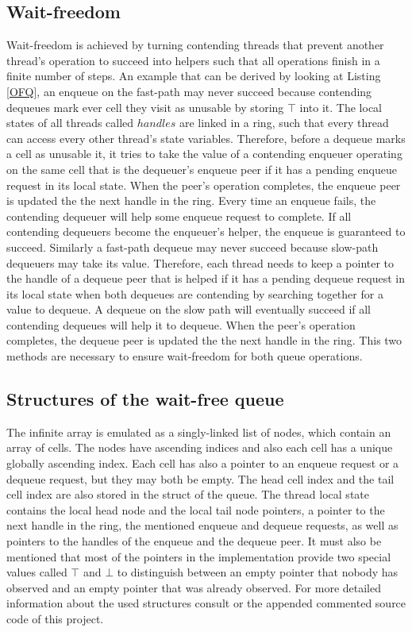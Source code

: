 \documentclass{article}
\begin{document}
\subsection{Wait-freedom}
Wait-freedom is achieved by turning contending threads that prevent another thread's operation to succeed into helpers such that all operations finish in a finite number of steps. An example that can be derived by looking at Listing \ref{OFQ}, an enqueue on the fast-path may never succeed because contending dequeues mark ever cell they visit as unusable by storing $\top$ into it. The local states of all threads called $handles$ are linked in a ring, such that every thread can access every other thread's state variables. Therefore, before a dequeue marks a cell as unusable it, it tries to take the value of a contending enqueuer operating on the same cell that is the dequeuer's enqueue peer if it has a pending enqueue request in its local state. When the peer's operation completes, the enqueue peer is updated the the next handle in the ring. Every time an enqueue fails, the contending dequeuer will help some enqueue request to complete. If all contending dequeuers become the enqueuer's helper, the enqueue is guaranteed to succeed. Similarly a fast-path dequeue may never succeed because slow-path dequeuers may take its value. Therefore, each thread needs to keep a pointer to the handle of a dequeue peer that is helped if it has a pending dequeue request in its local state when both dequeues are contending by searching together for a value to dequeue. A dequeue on the slow path will eventually succeed if all contending dequeues will help it to dequeue. When the peer's operation completes, the dequeue peer is updated the the next handle in the ring. This two methods are necessary to ensure wait-freedom for both queue operations.
\subsection{Structures of the wait-free queue}
The infinite array is emulated as a singly-linked list of nodes, which contain an array of cells. The nodes have ascending indices and also each cell has a unique globally ascending index. Each cell has also a pointer to an enqueue request or a dequeue request, but they may both be empty. The head cell index and the tail cell index are also stored in the struct of the queue. The thread local state contains the local head node and the local tail node pointers, a pointer to the next handle in the ring, the mentioned enqueue and dequeue requests, as well as pointers to the handles of the enqueue and the dequeue peer. It must also be mentioned that most of the pointers in the implementation provide two special values called $\top$ and $\bot$ to distinguish between an empty pointer that nobody has observed and an empty pointer that was already observed. For more detailed information about the used structures consult \cite{WFQ} or the appended commented source code of this project.
\end{document}
